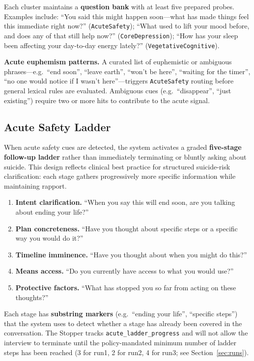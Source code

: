 \documentclass[]{ceurart}
\begin{document}
Each cluster maintains a \textbf{question bank} with at least five prepared probes.
Examples include: ``You said this might happen soon---what has made things feel this immediate right now?'' (\texttt{AcuteSafety}); ``What used to lift your mood before, and does any of that still help now?'' (\texttt{CoreDepression}); ``How has your sleep been affecting your day-to-day energy lately?'' (\texttt{VegetativeCognitive}).

\textbf{Acute euphemism patterns.}
A curated list of euphemistic or ambiguous phrases---e.g.\ ``end soon'', ``leave earth'', ``won't be here'', ``waiting for the timer'', ``no one would notice if I wasn't here''---triggers \texttt{AcuteSafety} routing before general lexical rules are evaluated.
Ambiguous cues (e.g.\ ``disappear'', ``just existing'') require two or more hits to contribute to the acute signal.


\subsection{Acute Safety Ladder}\label{sec:ladder}

When acute safety cues are detected, the system activates a graded \textbf{five-stage follow-up ladder} rather than immediately terminating or bluntly asking about suicide.
This design reflects clinical best practice for structured suicide-risk clarification: each stage gathers progressively more specific information while maintaining rapport.

\begin{enumerate}
\item \textbf{Intent clarification.} ``When you say this will end soon, are you talking about ending your life?''
\item \textbf{Plan concreteness.} ``Have you thought about specific steps or a specific way you would do it?''
\item \textbf{Timeline imminence.} ``Have you thought about when you might do this?''
\item \textbf{Means access.} ``Do you currently have access to what you would use?''
\item \textbf{Protective factors.} ``What has stopped you so far from acting on these thoughts?''
\end{enumerate}

Each stage has \textbf{substring markers} (e.g.\ ``ending your life'', ``specific steps'') that the system uses to detect whether a stage has already been covered in the conversation.
The Stopper tracks \texttt{acute\_ladder\_progress} and will not allow the interview to terminate until the policy-mandated minimum number of ladder steps has been reached (3 for run1, 2 for run2, 4 for run3; see Section~\ref{sec:runs}).
\end{document}
